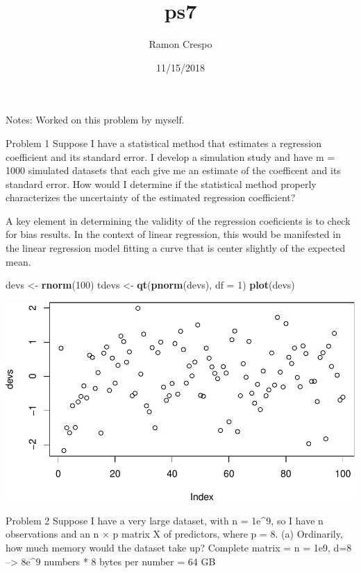 \documentclass[]{article}
\title{ps7}
\author{Ramon Crespo}
\date{11/15/2018}
\newenvironment{Shaded}{\begin{snugshade}}{\end{snugshade}}
\newcommand{\DataTypeTok}[1]{\textcolor[rgb]{0.13,0.29,0.53}{#1}}
\newcommand{\DecValTok}[1]{\textcolor[rgb]{0.00,0.00,0.81}{#1}}
\newcommand{\KeywordTok}[1]{\textcolor[rgb]{0.13,0.29,0.53}{\textbf{#1}}}
\newcommand{\NormalTok}[1]{#1}
\newcommand{\StringTok}[1]{\textcolor[rgb]{0.31,0.60,0.02}{#1}}
\begin{document}
\maketitle

Notes: Worked on this problem by myself.

Problem 1 Suppose I have a statistical method that estimates a
regression coefficient and its standard error. I develop a simulation
study and have m = 1000 simulated datasets that each give me an estimate
of the coefficent and its standard error. How would I determine if the
statistical method properly characterizes the uncertainty of the
estimated regression coefficient?

A key element in determining the validity of the regression coeficients
is to check for bias results. In the context of linear regression, this
would be manifested in the linear regression model fitting a curve that
is center slightly of the expected mean.

\begin{Shaded}
\begin{Highlighting}[]
\NormalTok{devs <-}\StringTok{ }\KeywordTok{rnorm}\NormalTok{(}\DecValTok{100}\NormalTok{)}
\NormalTok{tdevs <-}\StringTok{ }\KeywordTok{qt}\NormalTok{(}\KeywordTok{pnorm}\NormalTok{(devs), }\DataTypeTok{df =} \DecValTok{1}\NormalTok{) }
\KeywordTok{plot}\NormalTok{(devs)}
\end{Highlighting}
\end{Shaded}

\includegraphics{ps7_files/figure-latex/unnamed-chunk-1-1.pdf}

Problem 2 Suppose I have a very large dataset, with n = 1e\^{}9, so I
have n observations and an n × p matrix X of predictors, where p = 8.
(a) Ordinarily, how much memory would the dataset take up? Complete
matrix = n = 1e9, d=8 --\textgreater{} 8e\^{}9 numbers * 8 bytes per
number = 64 GB
\end{document}
